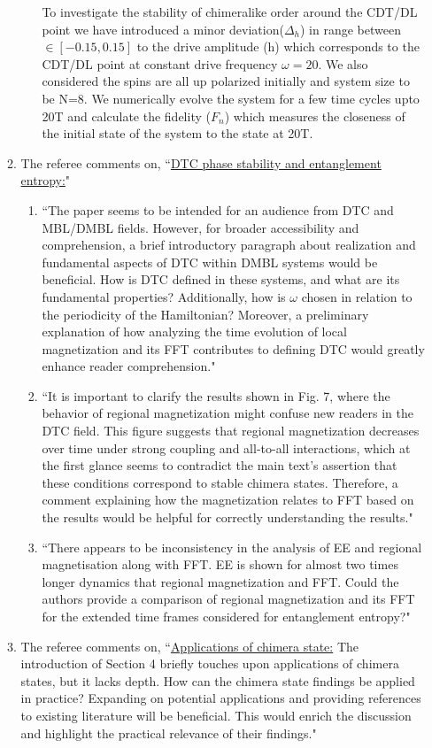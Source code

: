 \documentclass[aps,prb,reprint,showpacs,floatfix,superscriptaddress, onecolumn, nofootinbib, 10pt]{revtex4-2}
\newcommand{\comment}[1]{{\color{blue}#1}} %
\begin{document}
\begin{enumerate}
\begin{enumerate}
\begin{enumerate}
{			To investigate the stability of chimeralike order around the CDT/DL point we have introduced a minor deviation($\Delta_h$) in range between $\in[-0.15, 0.15]$ to the drive amplitude (h) which corresponds to the CDT/DL point at constant drive frequency $\omega = 20$. We also considered the spins are all up polarized initially and system size to be N=8. We numerically evolve the system for a few time cycles upto 20T and calculate the fidelity ($F_n$) which measures the closeness of the initial state of the system to the state at 20T.
			}
		\end{enumerate}
		\item The referee comments on, \comment{``\underline{DTC phase stability and entanglement entropy:}"}\\
		\begin{enumerate}
			\item \comment{``The paper seems to be intended for an audience from DTC and MBL/DMBL fields. However, for broader accessibility and comprehension, a brief introductory paragraph about realization and fundamental aspects of DTC within DMBL
				systems would be beneficial. How is DTC defined in these systems, and what are its fundamental properties? Additionally, how is $\omega$ chosen in relation to the
				periodicity of the Hamiltonian? Moreover, a preliminary explanation of how analyzing the time evolution of local magnetization and its FFT contributes to defining DTC would greatly enhance reader comprehension."}
			\item \comment{``It is important to clarify the results shown in Fig. 7, where the behavior of regional magnetization might confuse new readers in the DTC field. This figure suggests that regional magnetization decreases over time under strong coupling and all-to-all interactions, which at the first glance seems to contradict the main text’s assertion that these conditions correspond to stable chimera states. Therefore, a comment  explaining how the magnetization relates to FFT based on the results would be helpful for correctly understanding the results."}
			\item \comment{``There appears to be inconsistency in the analysis of EE and regional magnetisation along with FFT. EE is shown for almost two times longer dynamics that regional magnetization and FFT. Could the authors provide a comparison of regional  magnetization and its FFT for the extended time frames considered for entanglement entropy?"}
		\end{enumerate}
		\item The referee comments on, \comment{``\underline{Applications of chimera state:} The introduction of Section 4 briefly touches upon applications of chimera states, but it lacks depth. How can the chimera state findings be applied in practice? Expanding on potential applications and providing references to existing literature will be beneficial. This would enrich the discussion and highlight the practical relevance of their findings."}
	\end{enumerate}


\end{enumerate}
\end{document}
